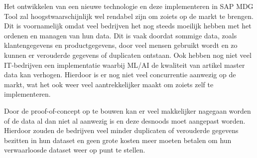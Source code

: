 Het ontwikkelen van een nieuwe technologie en deze implementeren in SAP MDG Tool zal hoogstwaarschijnlijk wel rendabel zijn om zoiets op de markt te brengen. Dit is voornamelijk omdat veel bedrijven het nog steeds moeilijk hebben met het ordenen en managen van hun data. Dit is vaak doordat sommige data, zoals klantengegevens en productgegevens, door veel mensen gebruikt wordt en zo kunnen er verouderde gegevens of duplicaten ontstaan. Ook hebben nog niet veel IT-bedrijven een implementatie waarbij ML/AI de kwaliteit van artikel master data kan verhogen. Hierdoor is er nog niet veel concurrentie aanwezig op de markt, wat het ook weer veel aantrekkelijker maakt om zoiets zelf te implementeren. 

Door de proof-of-concept op te bouwen kan er veel makkelijker nagegaan worden of de data al dan niet al aanwezig is en deze desnoods moet aangepast worden. Hierdoor zouden de bedrijven veel minder duplicaten of verouderde gegevens bezitten in hun dataset en geen grote kosten meer moeten betalen om hun verwaarloosde dataset weer op punt te stellen. 

